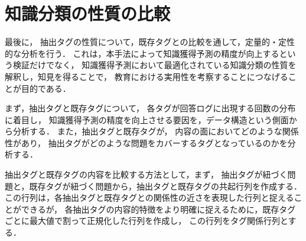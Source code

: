 \section{知識分類の性質の比較}
最後に，
抽出タグの性質について，既存タグとの比較を通して，定量的・定性的な分析を行う．
これは，本手法によって知識獲得予測の精度が向上するという検証だけでなく，
知識獲得予測において最適化されている知識分類の性質を解釈し，知見を得ることで，
教育における実用性を考察することにつなげることが目的である．

まず，抽出タグと既存タグについて，
各タグが回答ログに出現する回数の分布に着目し，
知識獲得予測の精度を向上させる要因を，データ構造という側面から分析する．
また，抽出タグと既存タグが，
内容の面においてどのような関係性があり，
抽出タグがどのような問題をカバーするタグとなっているのかを分析する．

抽出タグと既存タグの内容を比較する方法として，まず，
抽出タグが紐づく問題と，既存タグが紐づく問題から，抽出タグと既存タグの共起行列を作成する．
この行列は，各抽出タグと既存タグとの関係性の近さを表現した行列と捉えることができるが，
各抽出タグの内容的特徴をより明確に捉えるために，既存タグごとに最大値で割って正規化した行列を作成し，
この行列をタグ関係行列とする．

%
%

